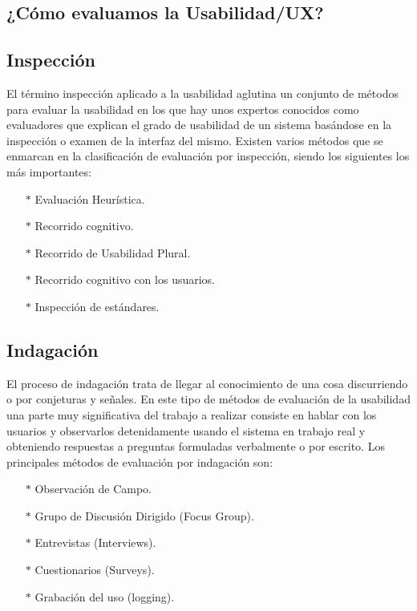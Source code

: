 \documentclass[11pt]{article}
\begin{document}
\begin{normalsize}
\begin{flushleft}
	\section{¿Cómo evaluamos la Usabilidad/UX?}
		\subsection{Inspección}
		\begin{itemize}
		    El término inspección aplicado a la usabilidad aglutina un conjunto de métodos para evaluar la usabilidad en los que hay unos expertos conocidos como evaluadores que explican el grado de usabilidad de un sistema basándose en la inspección o examen de la interfaz del mismo.
            Existen varios métodos que se enmarcan en la clasificación de evaluación por inspección, siendo los siguientes los más importantes:

		\end{itemize}
		\begin{itemize}
		    \begin{enumerate}
		        \item [$*$] Evaluación Heurística.
		        \item [$*$] Recorrido cognitivo.
		        \item [$*$] Recorrido de Usabilidad Plural.
		        \item [$*$] Recorrido cognitivo con los usuarios.
		        \item [$*$] Inspección de estándares.
		    \end{enumerate}
		\end{itemize}
		\subsection{Indagación}
		\begin{itemize}
		    El proceso de indagación trata de llegar al conocimiento de una cosa discurriendo o por conjeturas y señales. En este tipo de métodos de evaluación de la usabilidad una parte muy significativa del trabajo a realizar consiste en hablar con los usuarios y observarlos detenidamente usando el sistema en trabajo real y obteniendo respuestas a preguntas formuladas verbalmente o por escrito.
            Los principales métodos de evaluación por indagación son:
		\end{itemize}
		\begin{itemize}
		    \begin{enumerate}
		        \item [$*$] Observación de Campo.
		        \item [$*$] Grupo de Discusión Dirigido (Focus Group).
		        \item [$*$] Entrevistas (Interviews).
		        \item [$*$] Cuestionarios (Surveys).
		        \item [$*$] Grabación del uso (logging).
		    \end{enumerate}
		\end{itemize}

\end{flushleft}
\end{normalsize}
\end{document}
